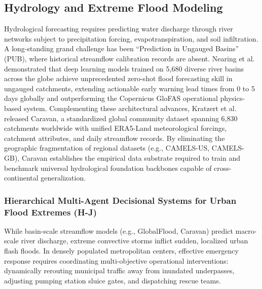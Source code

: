 \subsection{Hydrology and Extreme Flood Modeling}
Hydrological forecasting requires predicting water discharge through river networks subject to precipitation forcing, evapotranspiration, and soil infiltration. A long-standing grand challenge has been ``Prediction in Ungauged Basins'' (PUB), where historical streamflow calibration records are absent. Nearing et al.~\cite{nearing2024globalflood} demonstrated that deep learning models trained on 5,680 diverse river basins across the globe achieve unprecedented zero-shot flood forecasting skill in ungauged catchments, extending actionable early warning lead times from 0 to 5 days globally and outperforming the Copernicus GloFAS operational physics-based system. Complementing these architectural advances, Kratzert et al.~\cite{kratzert2023caravan} released Caravan, a standardized global community dataset spanning 6,830 catchments worldwide with unified ERA5-Land meteorological forcings, catchment attributes, and daily streamflow records. By eliminating the geographic fragmentation of regional datasets (e.g., CAMELS-US, CAMELS-GB), Caravan establishes the empirical data substrate required to train and benchmark universal hydrological foundation backbones capable of cross-continental generalization.

\subsubsection{Hierarchical Multi-Agent Decisional Systems for Urban Flood Extremes (H-J)}
While basin-scale streamflow models (e.g., GlobalFlood, Caravan) predict macro-scale river discharge, extreme convective storms inflict sudden, localized urban flash floods. In densely populated metropolitan centers, effective emergency response requires coordinating multi-objective operational interventions: dynamically rerouting municipal traffic away from inundated underpasses, adjusting pumping station sluice gates, and dispatching rescue teams.


